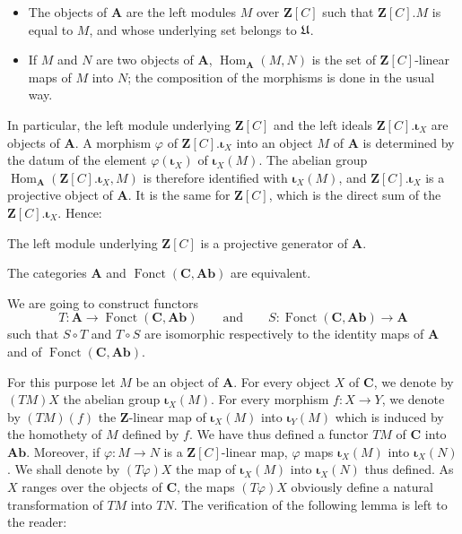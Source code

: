 \begin{itemize}
\item The objects of $\mathbf{A}$ are the left modules $M$ over
      $\mathbf{Z}[C]$ such that $\mathbf{Z}[C].M$ is equal to $M$, and whose
      underlying set belongs to $\mathfrak{U}$.

\item If $M$ and $N$ are two objects of $\mathbf{A}$,
      $\operatorname{Hom}_{\mathbf{A}}(M,N)$ is the set of
      $\mathbf{Z}[C]$-linear maps of $M$ into $N$; the composition of the
      morphisms is done in the usual way.
\end{itemize}

In particular, the left module underlying $\mathbf{Z}[C]$ and the left ideals
$\mathbf{Z}[C].\mathbf{\iota}_X$ are objects of $\mathbf{A}$. A morphism
$\varphi$ of $\mathbf{Z}[C].\mathbf{\iota}_X$ into an object $M$ of
$\mathbf{A}$ is determined by the datum of the element
$\varphi(\mathbf{\iota}_X)$ of $\mathbf{\iota}_X(M)$. The abelian group
$\operatorname{Hom}_{\mathbf{A}}(\mathbf{Z}[C].\mathbf{\iota}_X,M)$ is therefore
identified with $\mathbf{\iota}_X(M)$, and
$\mathbf{Z}[C].\mathbf{\iota}_X$ is a projective object of $\mathbf{A}$. It is
the same for $\mathbf{Z}[C]$, which is the direct sum of the
$\mathbf{Z}[C].\mathbf{\iota}_X$. Hence:

\begin{lemma}
The left module underlying $\mathbf{Z}[C]$ is a projective generator of
$\mathbf{A}$.
\end{lemma}

\begin{proposition}
The categories $\mathbf{A}$ and $\operatorname{Fonct}(\mathbf{C},\mathbf{Ab})$
are equivalent.
\end{proposition}

We are going to construct functors
\[
  T\colon \mathbf{A}\longrightarrow
  \operatorname{Fonct}(\mathbf{C},\mathbf{Ab})
  \qquad\text{and}\qquad
  S\colon \operatorname{Fonct}(\mathbf{C},\mathbf{Ab})\longrightarrow\mathbf{A}
\]
such that $S\circ T$ and $T\circ S$ are isomorphic respectively to the
identity maps of $\mathbf{A}$ and of $\operatorname{Fonct}(\mathbf{C},\mathbf{Ab})$.

For this purpose let $M$ be an object of $\mathbf{A}$. For every object $X$ of
$\mathbf{C}$, we denote by $(TM)X$ the abelian group
$\mathbf{\iota}_X(M)$. For every morphism $f\colon X\to Y$, we denote by
$(TM)(f)$ the $\mathbf{Z}$-linear map of $\mathbf{\iota}_X(M)$ into
$\mathbf{\iota}_Y(M)$ which is induced by the homothety of $M$ defined by
$f$. We have thus defined a functor $TM$ of $\mathbf{C}$ into $\mathbf{Ab}$.
Moreover, if $\varphi\colon M\to N$ is a $\mathbf{Z}[C]$-linear map,
$\varphi$ maps $\mathbf{\iota}_X(M)$ into $\mathbf{\iota}_X(N)$. We shall denote
by $(T\varphi)X$ the map of $\mathbf{\iota}_X(M)$ into
$\mathbf{\iota}_X(N)$ thus defined. As $X$ ranges over the objects of
$\mathbf{C}$, the maps $(T\varphi)X$ obviously define a natural
transformation of $TM$ into $TN$. The verification of the following lemma is
left to the reader:

